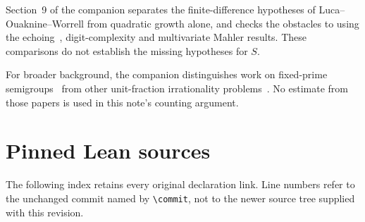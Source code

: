 \documentclass[11pt]{article}
\begin{document}
Section~9 of the companion separates the finite-difference hypotheses of
Luca--Ouaknine--Worrell
\cite[Definition~5, Theorems~6 and 8, Claim~10]{lucaouaknineworrell2025}
from quadratic growth alone, and checks the obstacles to using the
echoing~\cite{kebis2024echoing}, digit-complexity
\cite[Theorem~1]{adamczewskibugeaud2007} and multivariate Mahler
\cite{adamczewskifaverjon2026} results.  These comparisons do not establish
the missing hypotheses for $S$.

For broader background, the companion distinguishes work on fixed-prime
semigroups~\cite{tijdemanmeijer1974,languasco2025} from other unit-fraction
irrationality problems~\cite{kovactao2024}.  No estimate from those papers
is used in this note's counting argument.

\section{Pinned Lean sources}
\label{sec:pinned-lean-sources}
The following index retains every original declaration link.  Line numbers
refer to the unchanged commit named by \texttt{\textbackslash commit},
not to the newer source tree supplied with this revision.
\end{document}
